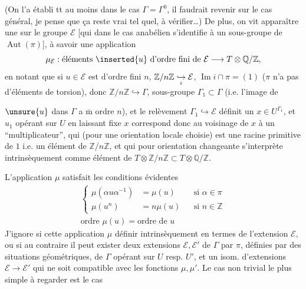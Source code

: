 (On l'a établi tt au moins dans le cas
\(\Gamma=\Gamma^0\), il faudrait revenir sur le cas général,
je pense que ça reste vrai tel quel, à vérifier\ldots)
De plus, on vit apparaître une 
sur le groupe \(\mathcal E\)
[qui dans le cas anabélien s'identifie à un sous-groupe de
\(\operatorname{Aut}(\pi)\)], à savoir une application
\[
\mu_{\mathcal E}:
\text{éléments }\inserted{u}\text{ d'ordre fini de }\mathcal E
\longrightarrow T\otimes\mathbb Q/\mathbb Z,
\]
 en notant que si \(u\in\mathcal E\) est d'ordre fini
\(n\),  \(\mathbb Z/n\mathbb Z\lhook\joinrel\xrightarrow[i]{}
\mathcal E\),  \(\operatorname{Im}i\cap\pi=(1)\)
(\(\pi\) n'a pas d'éléments de torsion), donc
\(\mathbb Z/n\mathbb Z\hookrightarrow\Gamma\),  sous-groupe
\(\Gamma_1\subset\Gamma\) (i.e. l'image de



\(\unsure{u}\) dans \(\Gamma\) a \(\overline{\mathrm m}\) ordre \(n\)),
et le relèvement \(\Gamma_1\hookrightarrow\mathcal E\) définit un
\(x\in U^{\Gamma_1}\),  et \(u_1\) opérant sur \(U\)
en laissant fixe \(x\) correspond donc au voisinage de \(x\) à un
``multiplicateur'', qui (pour une orientation locale choisie) est une
racine primitive  de \(1\) i.e. un élément de
\(\mathbb Z/n\mathbb Z\), et qui pour orientation changeante
s'interprète intrinsèquement comme élément de
\(T\otimes\mathbb Z/n\mathbb Z
\subset T\otimes\mathbb Q/\mathbb Z\).

L'application \(\mu\) satisfait les conditions évidentes
\[
\begin{gathered}
\left\{
\begin{aligned}
\mu(\alpha u\alpha^{-1})&=\mu(u) &&\text{si }\alpha\in\pi\\
\mu(u^n)&=n\mu(u) &&\text{si }n\in\mathbb Z
\end{aligned}
\right.\\
\text{ordre }\mu(u)=\text{ordre de }u
\end{gathered}
\]
J'ignore si cette application \(\mu\) 
 définir intrinsèquement en termes de l'extension
\(\mathcal E\), ou si au contraire il peut exister deux extensions
 \(\mathcal E,\mathcal E'\) de \(\Gamma\) par \(\pi\),
définies par des situations géométriques, de \(\Gamma\) opérant sur
\(U\) resp. \(U'\), et un isom. d'extensions
\(\mathcal E\longrightarrow\mathcal E'\) qui ne soit compatible avec
les fonctions \(\mu,\mu'\).
Le cas non trivial le plus simple à regarder est le cas

